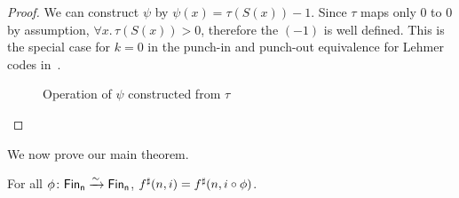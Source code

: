 \begin{proof}
    We can construct $\psi$ by $\psi(x) = \tau(S(x)) - 1$.
    Since $\tau$ maps only 0 to 0 by assumption, $\forall x. \, \tau(S(x)) > 0$, therefore
    the $(- 1)$ is well defined. This is the special case for $k = 0$ in the punch-in and punch-out
    equivalence for Lehmer codes in~\cite{choudhurySymmetriesReversibleProgramming2022}.

    \begin{figure}[H]
        \centering
        \hspace{1em}
        \caption{Operation of $\psi$ constructed from $\tau$}
        \label{fig:enter-label}
    \end{figure}
\end{proof}

We now prove our main theorem.

\begin{theorem}\label{bag:perm-sat}
    For all $\phi\colon \Fin[n]\xto{\sim}\Fin[n]$, $\ext{f}(n, i) \id \ext{f}(n, i \circ \phi)$.
\end{theorem}

